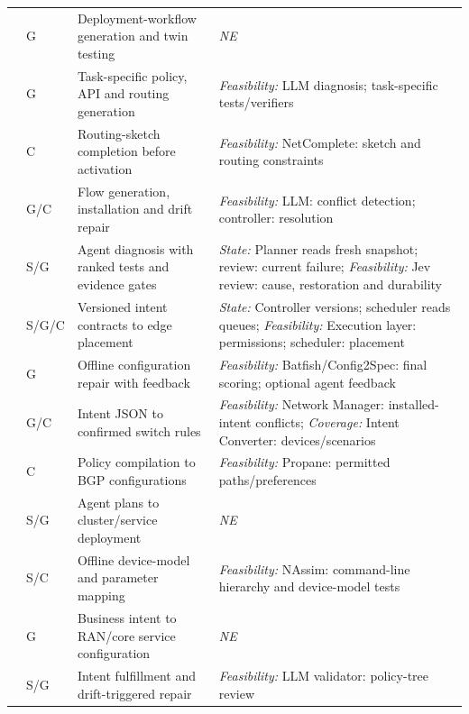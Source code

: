\begin{longtable}{>{\raggedright\arraybackslash}p{.09\soklitwidth}>{\centering\arraybackslash}p{.07\soklitwidth}>{\raggedright\arraybackslash}p{.36\soklitwidth}>{\raggedright\arraybackslash}p{.48\soklitwidth}}
\addlinespace[1pt]
\cite{nam2026llmbased} & G & Deployment-workflow generation and twin testing & \textit{NE} \\
\addlinespace[1pt]
\cite{wang2024netconfeval,e0arxiv230906342} & G & Task-specific policy, API and routing generation & \emph{Feasibility:} LLM diagnosis; task-specific tests/verifiers \\
\addlinespace[1pt]
\cite{el-hassany2018netcomplete} & C & Routing-sketch completion before activation & \emph{Feasibility:} NetComplete: sketch and routing constraints \\
\addlinespace[1pt]
\cite{hossain2025netintent} & G/C & Flow generation, installation and drift repair & \emph{Feasibility:} LLM: conflict detection; controller: resolution \\
\addlinespace[1pt]
\cite{clark2026jev} & S/G & Agent diagnosis with ranked tests and evidence gates & \emph{State:} Planner reads fresh snapshot; review: current failure; \emph{Feasibility:} Jev review: cause, restoration and durability \\
\addlinespace[1pt]
\cite{li2026fast} & S/G/C & Versioned intent contracts to edge placement & \emph{State:} Controller versions; scheduler reads queues; \emph{Feasibility:} Execution layer: permissions; scheduler: placement \\
\addlinespace[1pt]
\cite{asadli2026evaluating} & G & Offline configuration repair with feedback & \emph{Feasibility:} Batfish/Config2Spec: final scoring; optional agent feedback \\
\addlinespace[1pt]
\cite{angi2025llnet} & G/C & Intent JSON to confirmed switch rules & \emph{Feasibility:} Network Manager: installed-intent conflicts; \emph{Coverage:} Intent Converter: devices/scenarios \\
\addlinespace[1pt]
\cite{beckett2016dont} & C & Policy compilation to BGP configurations & \emph{Feasibility:} Propane: permitted paths/preferences \\
\addlinespace[1pt]
\cite{brodimas2025intentbased} & S/G & Agent plans to cluster/service deployment & \textit{NE} \\
\addlinespace[1pt]
\cite{chen2022softwaredefined} & S/C & Offline device-model and parameter mapping & \emph{Feasibility:} NAssim: command-line hierarchy and device-model tests \\
\addlinespace[1pt]
\cite{dinh2025endtoend} & G & Business intent to RAN/core service configuration & \textit{NE} \\
\addlinespace[1pt]
\cite{dzeparoska2024intent} & S/G & Intent fulfillment and drift-triggered repair & \emph{Feasibility:} LLM validator: policy-tree review \\

\end{longtable}
